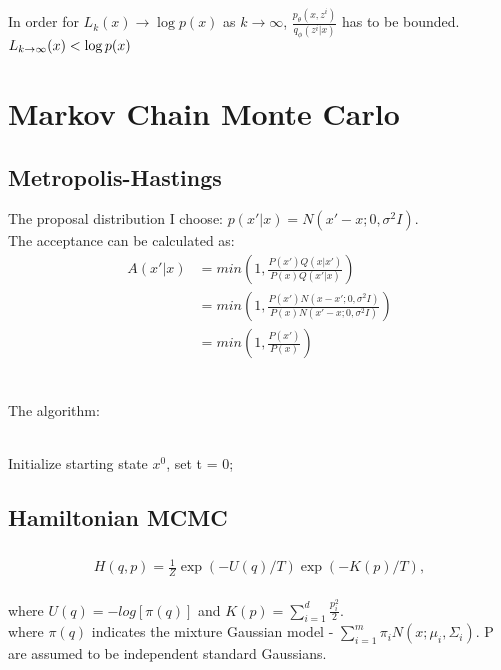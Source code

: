 \documentclass{article}
\begin{document}
\subsubsection{}
In order for $L_k(x) \rightarrow \log p(x)$ as $k \rightarrow \infty$, $\frac{p_{\theta}(x, z^i)}{q_{\phi}(z^i|x)}$ has to be bounded. \\
$
L_{k\rightarrow \infty}(x) < \log p(x) \\
$

\newpage
\section{Markov Chain Monte Carlo}
\subsection{Metropolis-Hastings}
The proposal distribution I choose: $p(x' | x) = N(x'-x; 0, \sigma^2I)$.\\
The acceptance can be calculated as: \\
\begin{align*}
	A(x'|x) &= min(1, \frac{P(x')Q(x|x')}{P(x)Q(x'|x)}) \\
	&= min(1, \frac{P(x')N(x-x'; 0, \sigma^2I)}{P(x)N(x'-x; 0, \sigma^2I)}) \\
	&= min(1, \frac{P(x')}{P(x)})
\end{align*}
\\
\\
The algorithm: 
\\
\\
\begin{algorithm}[H]
Initialize starting state $x^0$, set t = 0;\\
\end{algorithm}


\subsection{Hamiltonian MCMC}
\subsubsection{}
\begin{align*}
H(q, p) = \frac{1}{Z}\exp(-U(q)/T)\exp(-K(p)/T),
\end{align*} \\
where $U(q) = -log[\pi(q)]$ and $K(p) = \sum_{i=1}^d \frac{p_i^2}{2}$. \\
where $\pi(q)$ indicates the mixture Gaussian model - $\sum_{i=1}^m \pi_i N(x; \mu_i, \Sigma_i)$. P are assumed to be independent standard Gaussians.
\end{document}
